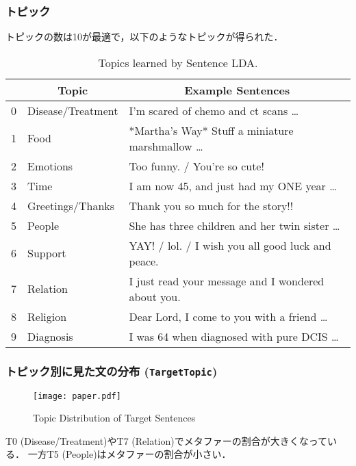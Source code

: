 \documentclass[11pt,usepdftitle=false]{beamer}
\newcommand\tableheader[1]{\multicolumn{1}{c}{\textbf{#1}}}
\begin{document}
\begin{frame}
    \frametitle{トピック}
    トピックの数は10が最適で，以下のようなトピックが得られた．
    \begin{table}
        \centering \scriptsize
        \caption{Topics learned by Sentence LDA.}
        \begin{tabular}{lll}
            \toprule
              & \tableheader{Topic} & \tableheader{Example Sentences} \\
            \midrule
            0 & Disease/Treatment & I’m scared of chemo and ct scans … \\
            1 & Food              & *Martha’s Way* Stuff a miniature marshmallow … \\
            2 & Emotions          & Too funny. / You’re so cute! \\
            3 & Time              & I am now 45, and just had my ONE year … \\
            4 & Greetings/Thanks  & Thank you so much for the story!! \\
            5 & People            & She has three children and her twin sister … \\
            6 & Support           & YAY! / lol. / I wish you all good luck and peace. \\
            7 & Relation          & I just read your message and I wondered about you. \\
            8 & Religion          & Dear Lord, I come to you with a friend … \\
            9 & Diagnosis         & I was 64 when diagnosed with pure DCIS … \\
            \bottomrule
        \end{tabular}
    \end{table}
\end{frame}

\begin{frame}
    \frametitle{トピック別に見た文の分布 (\texttt{TargetTopic})}
    \begin{figure}
        \centering
        \caption{Topic Distribution of Target Sentences}
        \texttt{[image: paper.pdf]}
        \label{topic-distribution-of-target-sentences}
    \end{figure}

    T0 (Disease/Treatment)やT7 (Relation)でメタファーの割合が大きくなっている．
    一方T5 (People)はメタファーの割合が小さい．
\end{frame}
\end{document}
